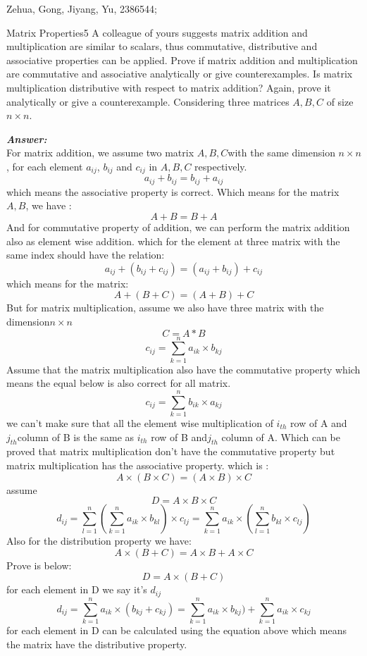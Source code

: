 \newif\ifvimbug
\vimbugfalse

\ifvimbug

\fi
Zehua, Gong, Jiyang, Yu, 2386544;
 




\begin{question}{Matrix Properties}{5}
A colleague of yours suggests matrix addition and multiplication are similar to scalars, thus commutative, distributive and associative properties can be applied.
Prove if matrix addition and multiplication are commutative and associative analytically or give counterexamples. 
Is matrix multiplication distributive with respect to matrix addition? 
Again, prove it analytically or give a counterexample.
Considering three matrices $ A, B, C$ of size $n\times n$.

\end{question}
\begin{answer}
\linebreak
\textbf{\textit{Answer:}}\\
For matrix addition, we assume two matrix $A, B ,C $with the same dimension $n\times n $, for each element  $a_{ij}$, $b_{ij}$ and $c_{ij}$ in $A, B,C$ respectively. $$a_{ij}+b_{ij} = b_{ij}+a_{ij}$$ which means the associative property is correct. Which means for the matrix $A,B$, we have :
$$A+B= B+A$$
\linebreak
And for commutative property of addition, we can perform the matrix addition also as element wise addition. which for the element at three matrix with the same index should have the relation:
$$a_{ij}+(b_{ij}+c_{ij}) = (a_{ij}+b_{ij})+c_{ij}$$
which means for the matrix:
$$A+(B+C) = (A+B)+C$$
\linebreak
But for matrix multiplication, assume we also have three matrix with the dimension$n\times n$
$$C=A*B$$
$$c_{ij} = \sum_{k=1}^n a_{ik}\times b_{kj}$$
Assume that the matrix multiplication also have the commutative property which means the equal below is also correct for all matrix.
$$c_{ij} = \sum_{k=1}^n b_{ik}\times a_{kj}$$
we can't make sure that all the element wise multiplication of $i_{th}$ row of A and $j_{th} $column of B is the same as  $i_{th}$ row of B and$ j_{th}$ column of A. Which can be proved that matrix multiplication don't have the commutative property
but matrix multiplication has the associative property. which is :
$$A\times (B\times C) = (A\times B) \times C$$
assume $$D = A\times B\times C$$
$$d_{ij} = \sum_{l=1}^n(\sum_{k=1}^n a_{ik}\times b_{kl}) \times c_{lj} = \sum_{k=1}^n a_{ik}\times (\sum_{l=1}^n b_{kl}\times c_{lj}) $$
\linebreak
Also for the distribution property we have:
$$A\times (B+C) = A\times B + A \times C$$
Prove is below:
$$D = A\times (B+C)$$
for each element in D we say it's $d_{ij}$
$$d_{ij} = \sum_{k=1}^n a_{ik} \times (b_{kj}+c_{kj}) = \sum_{k=1}^n a_{ik} \times b_{kj})  + \sum_{k=1}^n a_{ik} \times c_{kj}$$
for each element in D can be calculated using the equation above which means the matrix have the distributive property.


\end{answer}


